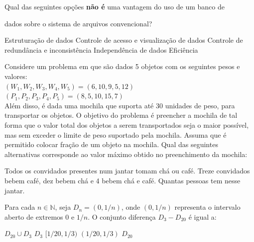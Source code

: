 \documentclass[12pt, addpoints]{exam}
\begin{document}
\begin{questions}
\question

Qual das seguintes opções \textbf{não é} uma vantagem do uso de um banco de

dados sobre o sistema de arquivos convencional?


\begin{choices}
\choice Estruturação de dados
\choice Controle de acesso e visualização de dados
\choice Controle de redundância e inconsistência
\choice Independência de dados
\choice Eficiência
\end{choices}

\question

Considere um problema em que são dados 5 objetos com os seguintes pesos e valores:\\

 $(W_1, W_2, W_3, W_4, W_5) = (6, 10, 9, 5, 12)$\\

 $(P_1, P_2, P_3, P_4, P_5) = (8, 5, 10, 15, 7)$\\

Além disso, é dada uma mochila que suporta até 30 unidades de peso, para transportar os objetos. O objetivo do problema é preencher a mochila de tal forma que o valor total dos objetos a serem transportados seja o maior possível, mas sem exceder o limite de peso suportado pela mochila. Assuma que é permitido colocar fração de um objeto na mochila. Qual das seguintes alternativas corresponde ao valor máximo obtido no preenchimento da mochila:
\begin{choices}
\end{choices}

\question

Todos os convidados presentes num jantar tomam chá ou café. Treze convidados bebem café, dez bebem chá e 4 bebem chá e café. Quantas pessoas tem nesse jantar.


\begin{choices}
\end{choices}

\question

Para cada \( n \in \mathbb{N} \), seja \( D_n = (0, 1/n) \), onde \( (0, 1/n) \) representa o intervalo aberto de extremos \( 0 \) e \( 1/n \). O conjunto diferença \( D_3 - D_{20} \) é igual a:


\begin{choices}
\choice \( D_{20} \cup D_3 \)
\choice \( D_3 \)
\choice \( [1/20, 1/3) \)
\choice \( (1/20, 1/3) \)
\choice \( D_{20} \)
\end{choices}


\end{questions}
\end{document}
